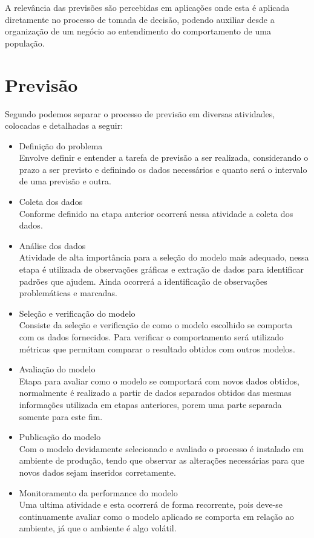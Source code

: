 \documentclass[
	12pt,
	oneside,
	a4paper,
	english,
	brazil
]{abntex2}
\begin{document}
A relevância das previsões são percebidas em aplicações onde esta é aplicada 
diretamente no processo de tomada de decisão, podendo auxiliar desde a 
organização de um negócio ao entendimento do comportamento de uma população.

\chapter{Previsão}
Segundo  podemos separar o processo de previsão em diversas 
atividades, colocadas e detalhadas a seguir:

\begin{itemize}
	\item Definição do problema\\
		Envolve definir e entender a tarefa de previsão a ser realizada,
		considerando o prazo a ser previsto e definindo os dados necessários e
		quanto será o intervalo de uma previsão e outra.
	\item Coleta dos dados\\
		Conforme definido na etapa anterior ocorrerá nessa atividade a coleta
		dos dados.
	\item Análise dos dados\\
		Atividade de alta importância para a seleção do modelo mais adequado,
		nessa etapa é utilizada de observações gráficas e extração de dados para
		identificar padrões que ajudem. Ainda ocorrerá a identificação de 
		observações problemáticas e marcadas.
	\item Seleção e verificação do modelo\\
		Consiste da seleção e verificação de como o modelo escolhido se comporta 
		com os dados fornecidos. Para verificar o comportamento será utilizado 
		métricas que permitam comparar o resultado obtidos com outros modelos.
	\item Avaliação do modelo\\
		Etapa para avaliar como o modelo se comportará com novos dados obtidos, 
		normalmente é realizado a partir de dados separados obtidos das mesmas 
		informações utilizada em etapas anteriores, porem uma parte separada 
		somente para este fim.
	\item Publicação do modelo\\
		Com o modelo devidamente selecionado e avaliado o processo é instalado 
		em ambiente de produção, tendo que observar as alterações necessárias 
		para que novos dados sejam inseridos corretamente.
	\item Monitoramento da performance do modelo\\
		Uma ultima atividade e esta ocorrerá de forma recorrente, pois deve-se 
		continuamente avaliar como o modelo aplicado se comporta em relação ao 
		ambiente, já que o ambiente é algo volátil.
\end{itemize}
\end{document}

